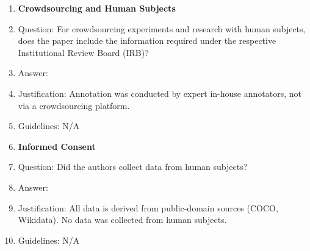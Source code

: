\begin{enumerate}
\item {\bf Crowdsourcing and Human Subjects}
\item[] Question: For crowdsourcing experiments and research with human subjects, does the paper include the information required under the respective Institutional Review Board (IRB)?
\item[] Answer: \answerNA{}
\item[] Justification: Annotation was conducted by expert in-house annotators, not via a crowdsourcing platform.
\item[] Guidelines: N/A

\item {\bf Informed Consent}
\item[] Question: Did the authors collect data from human subjects?
\item[] Answer: \answerNA{}
\item[] Justification: All data is derived from public-domain sources (COCO, Wikidata). No data was collected from human subjects.
\item[] Guidelines: N/A

\end{enumerate}
